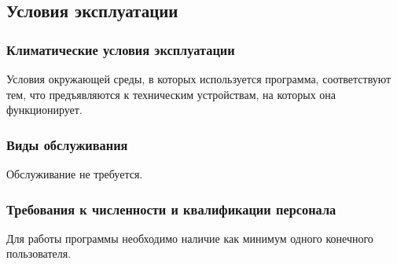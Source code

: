 \subsection{Условия эксплуатации}

\subsubsection{Климатические условия эксплуатации}

Условия окружающей среды, в которых используется программа, соответствуют тем, что предъявляются к техническим устройствам, на которых она функционирует.

\subsubsection{Виды обслуживания}

Обслуживание не требуется. 

\subsubsection{Требования к численности и квалификации персонала}

Для работы программы необходимо наличие как минимум одного конечного пользователя.